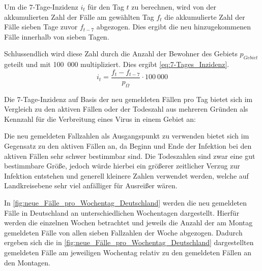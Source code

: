 Um die 7-Tage-Inzidenz $i_t$ für den Tag $t$ zu berechnen, wird von der akkumulierten Zahl der Fälle  am gewählten Tag $f_t$ die akkumulierte Zahl der Fälle sieben Tage zuvor $f_{t-7}$ abgezogen. Dies ergibt die neu hinzugekommenen Fälle innerhalb von sieben Tagen.

Schlussendlich wird diese Zahl durch die Anzahl der Bewohner des Gebiets $p_{Gebiet}$ geteilt und mit 100~000 multipliziert. Dies ergibt \autoref{eq:7-Tages_Inzidenz}.
\begin{equation}\label{eq:7-Tages_Inzidenz}
    i_t= \frac{f_t-f_{t-7}}{p_{\Omega}}\cdot 100~000
\end{equation}

Die 7-Tage-Inzidenz auf Basis der neu gemeldeten Fällen pro Tag bietet sich im Vergleich zu den aktiven Fällen oder der Todeszahl aus mehreren Gründen als Kennzahl für die Verbreitung eines Virus in einem Gebiet an:

Die neu gemeldeten Fallzahlen als Ausgangspunkt zu verwenden bietet sich im Gegensatz zu den aktiven Fällen an, da Beginn und Ende der Infektion bei den aktiven Fällen sehr schwer bestimmbar sind. Die Todeszahlen sind zwar eine gut bestimmbare Größe, jedoch würde hierbei ein größerer zeitlicher Verzug zur Infektion entstehen und generell kleinere Zahlen verwendet werden, welche auf Landkreisebene sehr viel anfälliger für Ausreißer wären.

In \autoref{fig:neue_Fälle_pro_Wochentag_Deutschland} werden die neu gemeldeten Fälle in Deutschland an unterschiedlichen Wochentagen dargestellt. Hierfür werden die einzelnen Wochen betrachtet und jeweils die Anzahl der am Montag gemeldeten Fälle von allen sieben Fallzahlen der Woche abgezogen. Dadurch ergeben sich die in \autoref{fig:neue_Fälle_pro_Wochentag_Deutschland} dargestellten gemeldeten Fälle am jeweiligen Wochentag relativ zu den gemeldeten Fällen an den Montagen.

